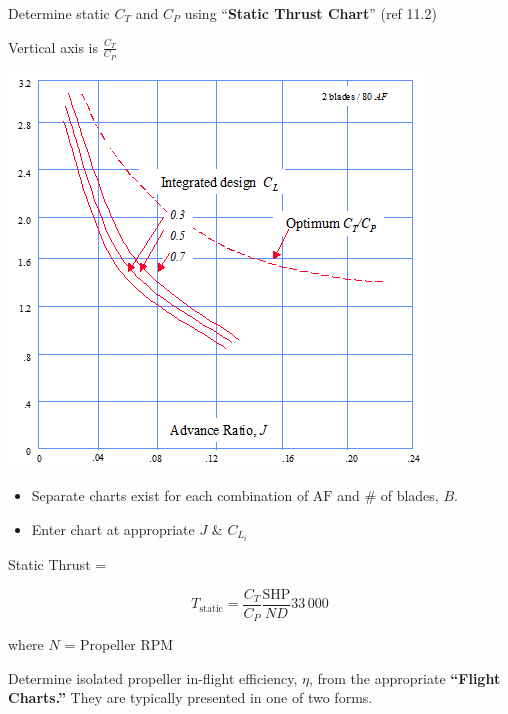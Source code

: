 \documentclass[
]{book}
\providecommand{\tightlist}{%
  \setlength{\itemsep}{0pt}\setlength{\parskip}{0pt}}
\begin{document}
Determine static \(C_T\) and \(C_P\) using ``\textbf{Static Thrust Chart}'' (ref 11.2)

Vertical axis is \(\frac{C_T}{C_P}\)

\includegraphics[width=4.36389in,height=4.10347in]{media/11/image21.png}

\begin{itemize}
\tightlist
\item
  Separate charts exist for each combination of \(\mathrm{AF}\) and \# of blades, \(B\).
\item
  Enter chart at appropriate \(J\) \& \(C_{L_i}\)
\end{itemize}

Static Thrust =

\[
T_{\text{static}} = \frac{C_T}{C_P} \frac{\mathrm{SHP}}{ND} 33\,000
\]

where \(N\) = Propeller \(\text{RPM}\)

Determine isolated propeller in-flight efficiency, \(\eta\), from the appropriate \textbf{``Flight Charts.''} They are typically presented in one of two forms.
\end{document}
